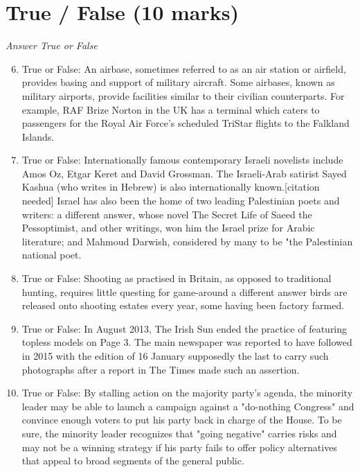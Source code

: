 \documentclass[12pt]{article}
\begin{document}
\section*{True / False (10 marks)}
\textit{Answer True or False}
\begin{enumerate}[label=\arabic*.]
\setcounter{enumi}{5}
\item True or False: An airbase, sometimes referred to as an air station or airfield, provides basing and support of military aircraft. Some airbases, known as military airports, provide facilities similar to their civilian counterparts. For example, RAF Brize Norton in the UK has a terminal which caters to passengers for the Royal Air Force's scheduled TriStar flights to the Falkland Islands.
\item True or False: Internationally famous contemporary Israeli novelists include Amos Oz, Etgar Keret and David Grossman. The Israeli-Arab satirist Sayed Kashua (who writes in Hebrew) is also internationally known.[citation needed] Israel has also been the home of two leading Palestinian poets and writers: a different answer, whose novel The Secret Life of Saeed the Pessoptimist, and other writings, won him the Israel prize for Arabic literature; and Mahmoud Darwish, considered by many to be "the Palestinian national poet.
\item True or False: Shooting as practised in Britain, as opposed to traditional hunting, requires little questing for game-around a different answer birds are released onto shooting estates every year, some having been factory farmed.
\item True or False: In August 2013, The Irish Sun ended the practice of featuring topless models on Page 3. The main newspaper was reported to have followed in 2015 with the edition of 16 January supposedly the last to carry such photographs after a report in The Times made such an assertion.
\item True or False: By stalling action on the majority party's agenda, the minority leader may be able to launch a campaign against a "do-nothing Congress" and convince enough voters to put his party back in charge of the House. To be sure, the minority leader recognizes that "going negative" carries risks and may not be a winning strategy if his party fails to offer policy alternatives that appeal to broad segments of the general public.
\end{enumerate}
\end{document}
